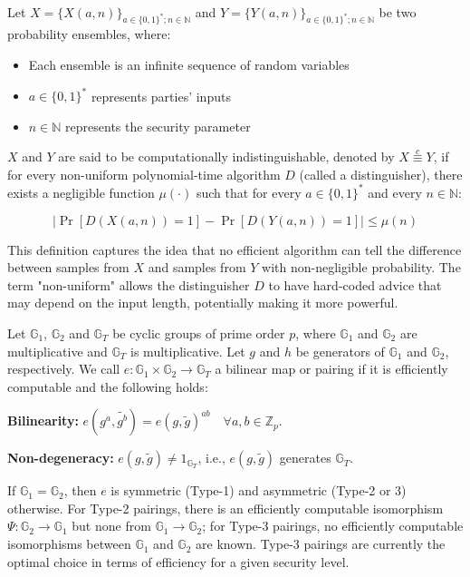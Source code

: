 \begin{definition} \\
    Let $X = \{X(a,n)\}_{a \in \{0,1\}^*; n \in \mathbb{N}}$ and $Y = \{Y(a,n)\}_{a \in \{0,1\}^*; n \in \mathbb{N}}$ be two probability ensembles, where:
    \begin{itemize}
        \item Each ensemble is an infinite sequence of random variables
        \item $a \in \{0,1\}^*$ represents parties' inputs
        \item $n \in \mathbb{N}$ represents the security parameter
    \end{itemize}
    
    $X$ and $Y$ are said to be computationally indistinguishable, denoted by $X \stackrel{c}{\equiv} Y$, if for every non-uniform polynomial-time algorithm $D$ (called a distinguisher), there exists a negligible function $\mu(\cdot)$ such that for every $a \in \{0,1\}^*$ and every $n \in \mathbb{N}$:
    
    \[ |\Pr[D(X(a,n)) = 1] - \Pr[D(Y(a,n)) = 1]| \leq \mu(n) \]
    
    \end{definition}
    
    \begin{remark}
    This definition captures the idea that no efficient algorithm can tell the difference between samples from $X$ and samples from $Y$ with non-negligible probability. The term "non-uniform" allows the distinguisher $D$ to have hard-coded advice that may depend on the input length, potentially making it more powerful.
    \end{remark}

\begin{definition}
    Let $\mathbb{G}_1$, $\mathbb{G}_2$ and $\mathbb{G}_T$ be cyclic groups of prime order $p$, where $\mathbb{G}_1$ and $\mathbb{G}_2$ are multiplicative and $\mathbb{G}_T$ is multiplicative. Let $g$ and $h$ be generators of $\mathbb{G}_1$ and $\mathbb{G}_2$, respectively. We call $e : \mathbb{G}_1 \times \mathbb{G}_2 \rightarrow \mathbb{G}_T$ a bilinear map or pairing if it is efficiently computable and the following holds:
    
    \textbf{Bilinearity:} $e(g^a, \tilde{g^b}) = e(g, \tilde{g})^{ab} \quad \forall a,b \in \mathbb{Z}_p$.
    
    \textbf{Non-degeneracy:} $e(g, \tilde{g}) \neq 1_{\mathbb{G}_T}$, i.e., $e(g, \tilde{g})$ generates $\mathbb{G}_T$.
    
   \noindent If $\mathbb{G}_1 = \mathbb{G}_2$, then $e$ is symmetric (Type-1) and asymmetric (Type-2 or 3) otherwise. For Type-2 pairings, there is an efficiently computable isomorphism $\Psi : \mathbb{G}_2 \rightarrow \mathbb{G}_1$ but none from $\mathbb{G}_1 \rightarrow \mathbb{G}_2$; for Type-3 pairings, no efficiently computable isomorphisms between $\mathbb{G}_1$ and $\mathbb{G}_2$ are known. Type-3 pairings are currently the optimal choice in terms of efficiency for a given security level.
\end{definition}


